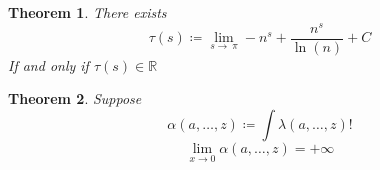 \documentclass[10pt, twocolumn]{article}
\theoremstyle{plain}
\newtheorem{theorem}{Theorem}[section]
\theoremstyle{definition}
\theoremstyle{remark}
\begin{document}
\begin{theorem}
  There exists
  \begin{equation}
    \tau (s) \coloneq \lim _{s\to \:\pi } -n^s+\frac{n^s}{\ln \left(n\right)}+C
  \end{equation}
  If and only if $\tau (s) \in \mathbb{R}$
\end{theorem}

\begin{theorem}
  Suppose
  \begin{equation}
    \alpha(a, \dots, z) \coloneq \int \lambda(a, \dots, z)! 
  \end{equation}
  \begin{equation}
    \lim_{x \to 0} \alpha(a, \dots, z) = +\infty
  \end{equation}
\end{theorem}
\end{document}
